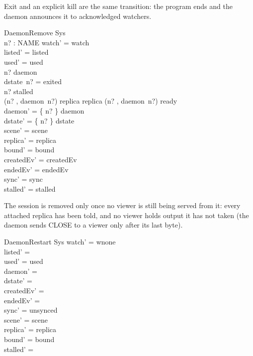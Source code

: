 \documentclass[a4paper,10pt,fleqn]{article}
\begin{document}
Exit and an explicit kill are the same transition: the program ends and
the daemon announces it to acknowledged watchers.

\begin{schema}{DaemonRemove}
  \Delta Sys \\
  n? : NAME
\where
  watch' = watch \\
  listed' = listed \\
  used' = used \\
  n? \in \dom daemon \\
  dstate~n? = exited \\
  n? \notin stalled \\
  (n? , daemon~n?) \in \dom replica \implies
    replica (n? , daemon~n?) \neq ready \\
  daemon' = \{ n? \} \ndres daemon \\
  dstate' = \{ n? \} \ndres dstate \\
  scene' = scene \\
  replica' = replica \\
  bound' = bound \\
  createdEv' = createdEv \\
  endedEv' = endedEv \\
  sync' = sync \\
  stalled' = stalled
\end{schema}

The session is removed only once no viewer is still being served from
it: every attached replica has been told, and no viewer holds output it has
not taken (the daemon sends CLOSE to a viewer only after its last byte).

\begin{schema}{DaemonRestart}
  \Delta Sys
\where
  watch' = wnone \\
  listed' = \emptyset \\
  used' = used \\
  daemon' = \emptyset \\
  dstate' = \emptyset \\
  createdEv' = \emptyset \\
  endedEv' = \emptyset \\
  sync' = unsynced \\
  scene' = scene \\
  replica' = replica \\
  bound' = bound \\
  stalled' = \emptyset
\end{schema}
\end{document}
